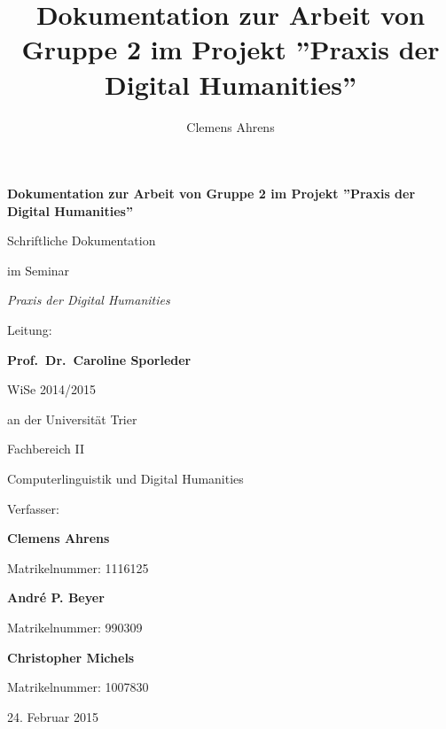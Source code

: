 \documentclass[a4paper,12pt,titlepage=true, ngerman]{scrartcl}
\title{Dokumentation zur Arbeit von Gruppe 2 im Projekt ''Praxis der Digital Humanities''} %
\author{Clemens Ahrens}
\begin{document}
\begin{titlepage}

\begin{center}

\vspace*{100pt}

\textbf{\Large{Dokumentation zur Arbeit von Gruppe 2 im Projekt ''Praxis der Digital Humanities''}}%

\vfill

Schriftliche Dokumentation

im Seminar

\emph{Praxis der Digital Humanities}


Leitung:

\textbf{Prof.\ Dr.\ Caroline Sporleder}%

WiSe 2014/2015%

\bigskip
\bigskip

an der Universität Trier

Fachbereich II

Computerlinguistik und Digital Humanities

\bigskip
\bigskip

Verfasser:


\textbf{Clemens Ahrens}

Matrikelnummer: 1116125

\textbf{André P. Beyer} %

Matrikelnummer: 990309

\textbf{Christopher Michels}

Matrikelnummer: 1007830

\bigskip
\bigskip

24. Februar 2015

\vfill

\end{center}

\end{titlepage}







\newpage
\end{document}
